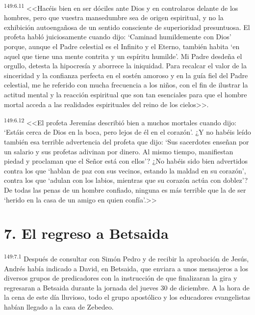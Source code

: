 \par 
\textsuperscript{149:6.11} <<Hacéis bien en ser dóciles ante Dios y en controlaros delante de los hombres, pero que vuestra mansedumbre sea de origen espiritual, y no la exhibición autoengañosa de un sentido consciente de superioridad presuntuosa. El profeta habló juiciosamente cuando dijo: `Caminad humildemente con Dios' porque, aunque el Padre celestial es el Infinito y el Eterno, también habita `en aquel que tiene una mente contrita y un espíritu humilde'. Mi Padre desdeña el orgullo, detesta la hipocresía y aborrece la iniquidad. Para recalcar el valor de la sinceridad y la confianza perfecta en el sostén amoroso y en la guía fiel del Padre celestial, me he referido con mucha frecuencia a los niños, con el fin de ilustrar la actitud mental y la reacción espiritual que son tan esenciales para que el hombre mortal acceda a las realidades espirituales del reino de los cielos>>.

\par 
\textsuperscript{149:6.12} <<El profeta Jeremías describió bien a muchos mortales cuando dijo: `Estáis cerca de Dios en la boca, pero lejos de él en el corazón'. ¿Y no habéis leído también esa terrible advertencia del profeta que dijo: `Sus sacerdotes enseñan por un salario y sus profetas adivinan por dinero. Al mismo tiempo, manifiestan piedad y proclaman que el Señor está con ellos'? ¿No habéis sido bien advertidos contra los que `hablan de paz con sus vecinos, estando la maldad en su corazón', contra los que `adulan con los labios, mientras que su corazón actúa con doblez'? De todas las penas de un hombre confiado, ninguna es más terrible que la de ser `herido en la casa de un amigo en quien confía'.>>

\section*{7. El regreso a Betsaida}
\par 
\textsuperscript{149:7.1} Después de consultar con Simón Pedro y de recibir la aprobación de Jesús, Andrés había indicado a David, en Betsaida, que enviara a unos mensajeros a los diversos grupos de predicadores con la instrucción de que finalizaran la gira y regresaran a Betsaida durante la jornada del jueves 30 de diciembre. A la hora de la cena de este día lluvioso, todo el grupo apostólico y los educadores evangelistas habían llegado a la casa de Zebedeo.

